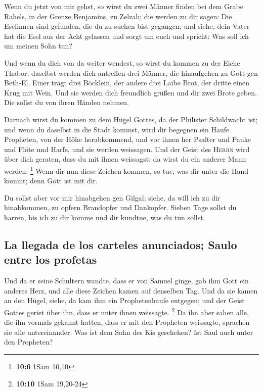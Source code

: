  Wenn du jetzt von mir gehst, so wirst du zwei Männer
finden bei dem Grabe Rahels, in der Grenze Benjamins, zu Zelzah; die
werden zu dir sagen: Die Eselinnen sind gefunden, die du zu suchen bist
gegangen; und siehe, dein Vater hat die Esel aus der Acht gelassen und
sorgt um euch und spricht: Was soll ich um meinen Sohn tun?

 Und wenn du dich von da weiter wendest, so wirst du
kommen zu der Eiche Thabor; daselbst werden dich antreffen drei Männer,
die hinaufgehen zu Gott gen Beth-El. Einer trägt drei Böcklein, der
andere drei Laibe Brot, der dritte einen Krug mit Wein. 
Und sie werden dich freundlich grüßen und dir zwei Brote geben. Die
sollst du von ihren Händen nehmen.

 Darnach wirst du kommen zu dem Hügel Gottes, da der
Philister Schildwacht ist; und wenn du daselbst in die Stadt kommst,
wird dir begegnen ein Haufe Propheten, von der Höhe herabkommend, und
vor ihnen her Psalter und Pauke und Flöte und Harfe, und sie werden
weissagen.  Und der Geist des \textsc{Herrn} wird über
dich geraten, dass du mit ihnen weissagst; da wirst du ein anderer Mann
werden. \footnote{\textbf{10:6} 1Sam 10,10}  Wenn dir nun
diese Zeichen kommen, so tue, was dir unter die Hand kommt; denn Gott
ist mit dir.

 Du sollst aber vor mir hinabgehen gen Gilgal; siehe, da
will ich zu dir hinabkommen, zu opfern Brandopfer und Dankopfer. Sieben
Tage sollst du harren, bis ich zu dir komme und dir kundtue, was du tun
sollst.

\hypertarget{la-llegada-de-los-carteles-anunciados-saulo-entre-los-profetas}{%
\subsection{La llegada de los carteles anunciados; Saulo entre los
profetas}\label{la-llegada-de-los-carteles-anunciados-saulo-entre-los-profetas}}

 Und da er seine Schultern wandte, dass er von Samuel
ginge, gab ihm Gott ein anderes Herz, und alle diese Zeichen kamen auf
denselben Tag.  Und da sie kamen an den Hügel, siehe, da
kam ihm ein Prophetenhaufe entgegen; und der Geist Gottes geriet über
ihn, dass er unter ihnen weissagte. \footnote{\textbf{10:10} 1Sam
  19,20-24}  Da ihn aber sahen alle, die ihn vormals
gekannt hatten, dass er mit den Propheten weissagte, sprachen sie alle
untereinander: Was ist dem Sohn des Kis geschehen? Ist Saul auch unter
den Propheten?

